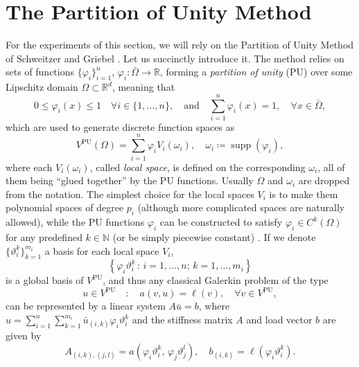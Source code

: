 \documentclass[a4paper]{article}
\DeclareMathOperator{\supp}{supp}
\theoremstyle{plain}
\theoremstyle{definition}
\theoremstyle{remark}
\begin{document}
\section{The Partition of Unity Method}\label{sec:pum}

For the experiments of this section, we will rely on the Partition of Unity Method of Schweitzer and Griebel \cite{Schweitzer2003, Griebel2002}. Let us succinctly introduce it. The method relies on sets of functions \(\{\varphi_i\}_{i=1}^n\), \(\varphi_i \colon \bar{\Omega} \to \mathbb{R}\), forming a \emph{partition of unity} (PU) over some Lipschitz domain \(\Omega\subset\mathbb{R}^d\), meaning that
\begin{equation*}
	0 \leq \varphi_i(x) \leq 1 \quad \forall i \in \{1,\dots,n\}, \quad \text{and} \quad \sum_{i=1}^n \varphi_i(x) = 1,\quad \forall x \in \bar{\Omega},
\end{equation*}
which are used to generate discrete function spaces as
\begin{equation*}
	V^{\mathrm{PU}}(\Omega) = \sum_{i=1}^n \varphi_i V_i(\omega_i),\quad \omega_i \coloneqq \supp(\varphi_i),
\end{equation*}
where each \(V_i(\omega_i)\), called \emph{local space}, is defined on the corresponding \(\omega_i\), all of them being ``glued together'' by the PU functions. Usually \(\Omega\) and \(\omega_i\) are dropped from the notation. The simplest choice for the local spaces \(V_i\) is to make them polynomial spaces of degree \(p_i\) (although more complicated spaces are naturally allowed), while the PU functions \(\varphi_i\) can be constructed to satisfy \(\varphi_i \in C^{k}(\Omega)\) for any predefined \(k \in \mathbb{N}\) (or be simply piecewise constant) \cite{JimenezRecio2024}. If we denote \(\{\vartheta_i^{k}\}_{k=1}^{m_i}\) a basis for each local space \(V_i\),
\begin{equation*}
	\left\{\varphi_i \vartheta_i^{k} \,\colon\, i = 1,\dots,n; \, k = 1, \dots, m_i\right\}
\end{equation*}
is a global basis of \(V^{\mathrm{PU}}\), and thus any classical Galerkin problem of the type
\begin{equation*}
	u\in V^{\mathrm{PU}} \quad\colon\quad a(v, u) = \ell(v), \quad \forall v\in V^{\mathrm{PU}},
\end{equation*}
can be represented by a linear system \(A \bar{u} = b\), where \(u = \sum_{i=1}^n \sum_{k=1}^{m_i} \bar{u}_{(i,k)} \varphi_i  \vartheta^{k}_{i}\) and the stiffness matrix \(A\) and load vector \(b\) are given by
\begin{equation*}
	A_{(i,k),(j,l)} = a(\varphi_i \vartheta_i^{k}, \,\varphi_j \vartheta_j^{l}),\quad b_{(i,k)} = \ell(\varphi_i \vartheta_i^{k}).
\end{equation*}
\end{document}
